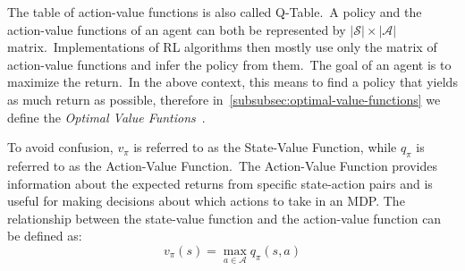 \documentclass[../xlapes02]{subfiles}
\begin{document}
    The table of action-value functions is also called Q-Table.\ A policy and the action-value functions of an agent can both be represented by $|\mathcal{S}|\times|\mathcal{A}|$ matrix.\ Implementations of RL algorithms then mostly use only the matrix of action-value functions and infer the policy from them.\ The goal of an agent is to maximize the return.\ In the above context, this means to find a policy that yields as much return as possible, therefore in~\cref{subsubsec:optimal-value-functions} we define the \emph{Optimal Value Funtions}~\cite{sutton2018reinforcement}.

    To avoid confusion, $v_\pi$ is referred to as the State-Value Function, while $q_\pi$ is referred to as the Action-Value Function.\ The Action-Value Function provides information about the expected returns from specific state-action pairs and is useful for making decisions about which actions to take in an MDP. The relationship between the state-value function and the action-value function can be defined as:
    \begin{equation}
        \label{eq:state-value-function-2}
        v_\pi(s) = \max_{a\in\mathcal{A}} q_\pi(s, a)
    \end{equation}
\end{document}
